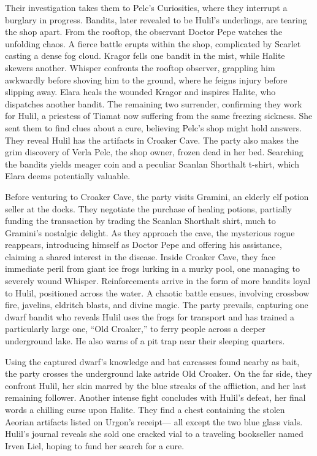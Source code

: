 \documentclass[
  letterpaper,12pt,twoside,twocolumn,openany,
  nodeprecatedcode,bg=full]{dndbook}
\begin{document}
Their investigation takes them to Pelc's Curiosities, where they
interrupt a burglary in progress. Bandits, later revealed to be Hulil's
underlings, are tearing the shop apart. From the rooftop, the observant
Doctor Pepe watches the unfolding chaos. A fierce battle erupts within
the shop, complicated by Scarlet casting a dense fog cloud. Kragor fells
one bandit in the mist, while Halite skewers another. Whisper confronts
the rooftop observer, grappling him awkwardly before shoving him to the
ground, where he feigns injury before slipping away. Elara heals the
wounded Kragor and inspires Halite, who dispatches another bandit. The
remaining two surrender, confirming they work for Hulil, a priestess of
Tiamat now suffering from the same freezing sickness. She sent them to
find clues about a cure, believing Pelc's shop might hold answers. They
reveal Hulil has the artifacts in Croaker Cave. The party also makes the
grim discovery of Verla Pelc, the shop owner, frozen dead in her bed.
Searching the bandits yields meager coin and a peculiar Scanlan
Shorthalt t-shirt, which Elara deems potentially valuable.

Before venturing to Croaker Cave, the party visits Gramini, an elderly
elf potion seller at the docks. They negotiate the purchase of healing
potions, partially funding the transaction by trading the Scanlan
Shorthalt shirt, much to Gramini's nostalgic delight. As they approach
the cave, the mysterious rogue reappears, introducing himself as Doctor
Pepe and offering his assistance, claiming a shared interest in the
disease. Inside Croaker Cave, they face immediate peril from giant ice
frogs lurking in a murky pool, one managing to severely wound Whisper.
Reinforcements arrive in the form of more bandits loyal to Hulil,
positioned across the water. A chaotic battle ensues, involving crossbow
fire, javelins, eldritch blasts, and divine magic. The party prevails,
capturing one dwarf bandit who reveals Hulil uses the frogs for
transport and has trained a particularly large one, ``Old Croaker,'' to
ferry people across a deeper underground lake. He also warns of a pit
trap near their sleeping quarters.

Using the captured dwarf's knowledge and bat carcasses found nearby as
bait, the party crosses the underground lake astride Old Croaker. On the
far side, they confront Hulil, her skin marred by the blue streaks of
the affliction, and her last remaining follower. Another intense fight
concludes with Hulil's defeat, her final words a chilling curse upon
Halite. They find a chest containing the stolen Aeorian artifacts listed
on Urgon's receipt--- all except the two blue glass vials. Hulil's
journal reveals she sold one cracked vial to a traveling bookseller
named Irven Liel, hoping to fund her search for a cure.
\end{document}
